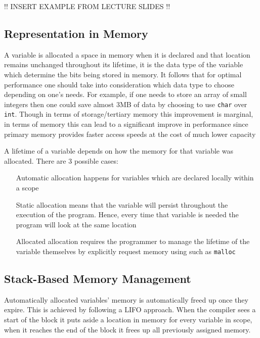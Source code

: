 !! INSERT EXAMPLE FROM LECTURE SLIDES !!

\subsection{Representation in Memory}

\par{A variable is allocated a space in memory when it is declared and that location remains unchanged throughout
its lifetime, it is the data type of the variable which determine the bits being stored in memory.
It follows that for optimal performance one should take into consideration which data type to choose
depending on one's needs. For example, if one needs to store an array of small integers then one
could save almost 3MB of data by choosing to use \texttt{char} over \texttt{int}. Though in terms of
storage/tertiary memory this improvement is marginal, in terms of memory this can lead to a significant improve in
performance since primary memory provides faster access speeds at the cost of much lower capacity} 
\par{A lifetime of a variable depends on how the memory for that variable was allocated. There
are 3 possible cases:}
\begin{itemize}
	\item[Automatic] allocation happens for variables which are declared locally within a scope
	\item[Static] allocation means that the variable will persist throughout the execution of
	the program. Hence, every time that variable is needed the program will look at the same location
	\item[Allocated] allocation requires the programmer to manage the lifetime of the variable
	themselves by  explicitly request memory using  such as \texttt{malloc}
\end{itemize}

\subsection{Stack-Based Memory Management}
\par{Automatically allocated variables' memory is automatically freed up once they expire. This
is achieved by following a LIFO  approach. When the compiler sees a
start of the block it puts aside a location in memory for every variable in scope, when it reaches
the end of the block it frees up all previously assigned memory.}

